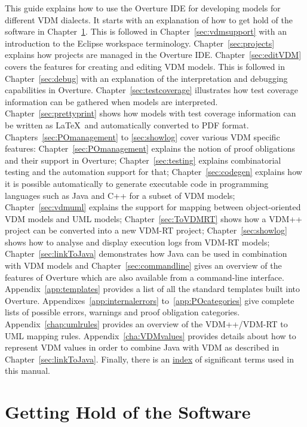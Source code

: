 \documentclass{overturerepchap}
\begin{document}
This guide explains how to use the Overture IDE for developing models
for different VDM dialects. It starts with an explanation
of how to get hold of the software in
Chapter~\ref{sec:install}. This is followed in
Chapter~\ref{sec:vdmsupport} with an introduction to the Eclipse
workspace terminology. Chapter~\ref{sec:projects} explains how
projects are managed in the Overture IDE. Chapter~\ref{sec:editVDM}
covers the features for creating and editing VDM models. This is
followed in Chapter~\ref{sec:debug} with an explanation of the
interpretation and debugging capabilities in Overture.
Chapter~\ref{sec:testcoverage} illustrates how test coverage
information can be gathered when models are interpreted.
Chapter~\ref{sec:prettyprint} shows how models with test
coverage information can be written as
\LaTeX\ and automatically converted to PDF format.
Chapters~\ref{sec:POmanagement} to \ref{sec:showlog} cover various
VDM specific features: Chapter~\ref{sec:POmanagement}
explains the notion of proof obligations and their support in
Overture; Chapter~\ref{sec:testing} explains
combinatorial testing and the automation support for that; Chapter~\ref{sec:codegen} explains
how it is possible automatically to generate executable code in programming languages such as Java and C++ for a subset of VDM models;
Chapter~\ref{sec:vdmuml} explains the support for mapping between
object-oriented VDM models and UML models; Chapter~\ref{sec:ToVDMRT}
shows how a VDM++ project can be
converted into a new VDM-RT project; Chapter~\ref{sec:showlog} shows
how to analyse and display execution logs from VDM-RT models; 
Chapter~\ref{sec:linkToJava} demonstrates how Java can be used in 
combination with VDM models and
Chapter~\ref{sec:commandline} gives an
overview of the features of Overture which are also available from
a command-line interface. Appendix~\ref{app:templates} provides a list
of all the standard templates built into Overture.
Appendixes~\ref{app:internalerrors}
to~\ref{app:POcategories} give complete lists of possible errors,
warnings and proof obligation categories. Appendix~\ref{chap:umlrules} provides
an overview of the VDM++/VDM-RT to UML mapping rules. 
Appendix~\ref{cha:VDMvalues} provides details about how to represent VDM 
values in order to combine Java with VDM as described in Chapter~\ref{sec:linkToJava}.
Finally, there is an \hyperref[sec:index]{index} of significant terms used in this
manual.


\chapter{Getting Hold of the Software}\label{sec:install}
\end{document}

